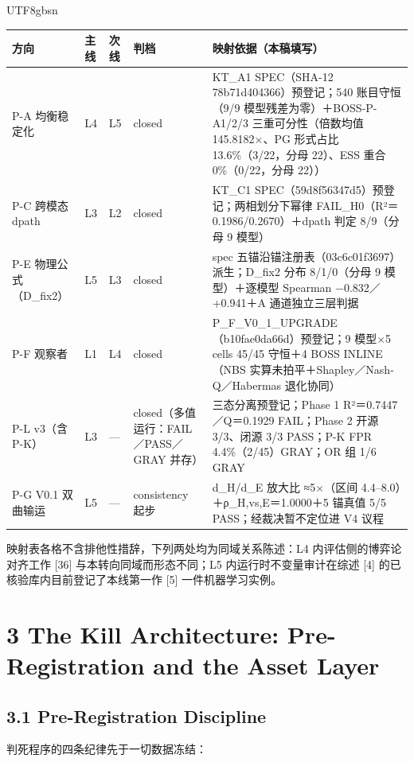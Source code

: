 \documentclass[10pt,a4paper]{article}
\begin{document}
\begin{CJK}{UTF8}{gbsn}
\begin{longtable}{>{\raggedright\arraybackslash}p{68pt}>{\raggedright\arraybackslash}p{20pt}>{\raggedright\arraybackslash}p{20pt}>{\raggedright\arraybackslash}p{70pt}>{\raggedright\arraybackslash}p{202pt}}
\toprule
\textbf{方向} & \textbf{主线} & \textbf{次线} & \textbf{判档} & \textbf{映射依据（本稿填写）} \\
\midrule
\endhead
P-A 均衡稳定化 & L4 & L5 & closed & KT\_A1 SPEC（SHA-12 78b71d404366）预登记；540 账目守恒（9/9 模型残差为零）＋BOSS-P-A1/2/3 三重可分性（倍数均值 145.8182×、PG 形式占比 13.6\%（3/22，分母 22）、ESS 重合 0\%（0/22，分母 22）） \\
P-C 跨模态 dpath & L3 & L2 & closed & KT\_C1 SPEC（59d8f56347d5）预登记；两相划分下幂律 FAIL\_H0（R²＝0.1986/0.2670）＋dpath 判定 8/9（分母 9 模型） \\
P-E 物理公式（D\_fix2） & L5 & L3 & closed & spec 五锚沿锚注册表（03c6c01f3697）派生；D\_fix2 分布 8/1/0（分母 9 模型）＋逐模型 Spearman −0.832／+0.941＋A 通道独立三层判据 \\
P-F 观察者 & L1 & L4 & closed & P\_F\_V0\_1\_UPGRADE（b10fae0da66d）预登记；9 模型×5 cells 45/45 守恒＋4 BOSS INLINE（NBS 实算未拍平＋Shapley／Nash-Q／Habermas 退化协同） \\
P-L v3（含 P-K） & L3 & — & closed（多值运行：FAIL／PASS／GRAY 并存） & 三态分离预登记；Phase 1 R²＝0.7447／Q＝0.1929 FAIL；Phase 2 开源 3/3、闭源 3/3 PASS；P-K FPR 4.4\%（2/45）GRAY；OR 组 1/6 GRAY \\
P-G V0.1 双曲输运 & L5 & — & consistency 起步 & d\_H/d\_E 放大比 ≈5×（区间 4.4–8.0）＋ρ\_H,vs,E＝1.0000＋5 锚真值 5/5 PASS；经裁决暂不定位进 V4 议程 \\
\bottomrule
\end{longtable}

映射表各格不含排他性措辞，下列两处均为同域关系陈述：L4 内评估侧的博弈论对齐工作 [36] 与本转向同域而形态不同；L5 内运行时不变量审计在综述 [4] 的已核验库内目前登记了本线第一作 [5] 一件机器学习实例。


\section*{3 The Kill Architecture: Pre-Registration and the Asset Layer}\subsection*{3.1 Pre-Registration Discipline}判死程序的四条纪律先于一切数据冻结：


\end{CJK}
\end{document}
